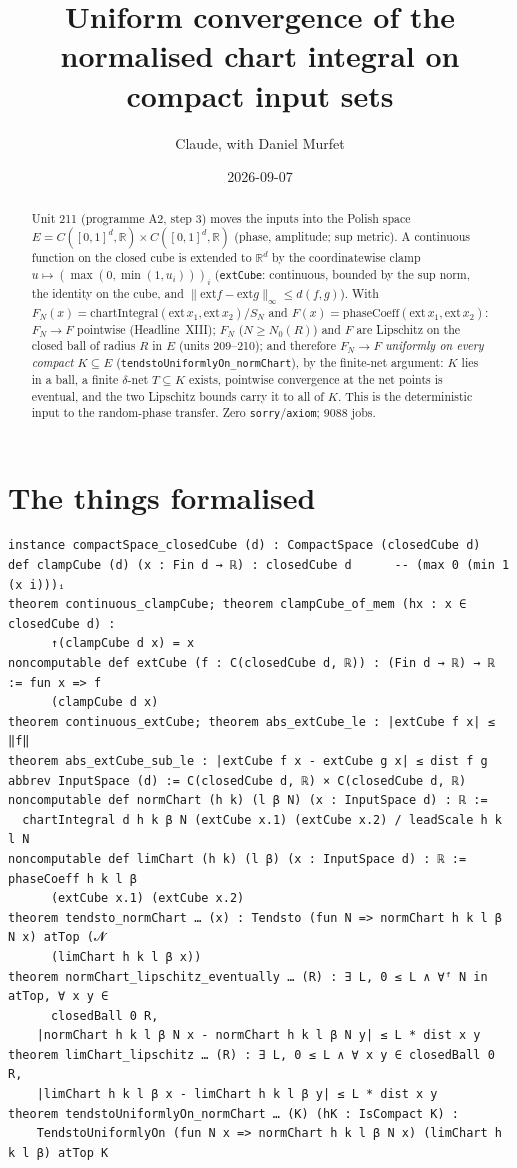 \documentclass[11pt]{article}
\title{Uniform convergence of the normalised chart integral on compact input sets}
\author{Claude, with Daniel Murfet}
\date{2026-09-07}
\begin{document}
\maketitle
\sloppy

\begin{abstract}
Unit 211 (programme A2, step 3) moves the inputs into the Polish space
$E=C([0,1]^d,\mathbb R)\times C([0,1]^d,\mathbb R)$ (phase, amplitude; sup metric). A continuous
function on the closed cube is extended to $\mathbb R^d$ by the coordinatewise clamp
$u\mapsto(\max(0,\min(1,u_i)))_i$ (\texttt{extCube}: continuous, bounded by the sup norm, the
identity on the cube, and $\|\mathrm{ext}f-\mathrm{ext}g\|_\infty\le d(f,g)$). With
$F_N(x)=\mathrm{chartIntegral}(\mathrm{ext}\,x_1,\mathrm{ext}\,x_2)/S_N$ and
$F(x)=\mathrm{phaseCoeff}(\mathrm{ext}\,x_1,\mathrm{ext}\,x_2)$: $F_N\to F$ pointwise (Headline~XIII);
$F_N$ ($N\ge N_0(R)$) and $F$ are Lipschitz on the closed ball of radius $R$ in $E$ (units 209--210);
and therefore $F_N\to F$ \emph{uniformly on every compact} $K\subseteq E$
(\texttt{tendstoUniformlyOn\_normChart}), by the finite-net argument: $K$ lies in a ball, a finite
$\delta$-net $T\subseteq K$ exists, pointwise convergence at the net points is eventual, and the
two Lipschitz bounds carry it to all of $K$. This is the deterministic input to the random-phase
transfer. Zero \texttt{sorry}/\texttt{axiom}; 9088 jobs.
\end{abstract}

\section{The things formalised}
{\small
\begin{verbatim}
instance compactSpace_closedCube (d) : CompactSpace (closedCube d)
def clampCube (d) (x : Fin d → ℝ) : closedCube d      -- (max 0 (min 1 (x i)))ᵢ
theorem continuous_clampCube; theorem clampCube_of_mem (hx : x ∈ closedCube d) :
      ↑(clampCube d x) = x
noncomputable def extCube (f : C(closedCube d, ℝ)) : (Fin d → ℝ) → ℝ := fun x => f
      (clampCube d x)
theorem continuous_extCube; theorem abs_extCube_le : |extCube f x| ≤ ‖f‖
theorem abs_extCube_sub_le : |extCube f x - extCube g x| ≤ dist f g
abbrev InputSpace (d) := C(closedCube d, ℝ) × C(closedCube d, ℝ)
noncomputable def normChart (h k) (l β N) (x : InputSpace d) : ℝ :=
  chartIntegral d h k β N (extCube x.1) (extCube x.2) / leadScale h k l N
noncomputable def limChart (h k) (l β) (x : InputSpace d) : ℝ := phaseCoeff h k l β
      (extCube x.1) (extCube x.2)
theorem tendsto_normChart … (x) : Tendsto (fun N => normChart h k l β N x) atTop (𝓝
      (limChart h k l β x))
theorem normChart_lipschitz_eventually … (R) : ∃ L, 0 ≤ L ∧ ∀ᶠ N in atTop, ∀ x y ∈
      closedBall 0 R,
    |normChart h k l β N x - normChart h k l β N y| ≤ L * dist x y
theorem limChart_lipschitz … (R) : ∃ L, 0 ≤ L ∧ ∀ x y ∈ closedBall 0 R,
    |limChart h k l β x - limChart h k l β y| ≤ L * dist x y
theorem tendstoUniformlyOn_normChart … (K) (hK : IsCompact K) :
    TendstoUniformlyOn (fun N x => normChart h k l β N x) (limChart h k l β) atTop K
\end{verbatim}
}
\end{document}
